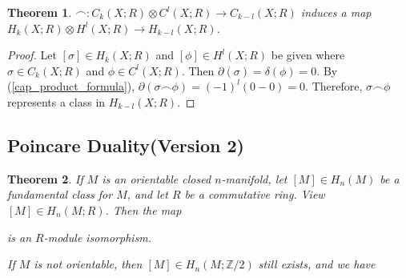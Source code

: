 \documentclass[psamsfonts]{amsart}
\newtheorem{thm}{Theorem}[section]
\theoremstyle{definition}
\theoremstyle{rem}
\numberwithin{equation}{section}
\begin{document}
\begin{thm}
  $\frown: C_k(X; R) \otimes C^l(X; R) \rightarrow C_{k - l}(X; R)$ induces a map $H_k(X; R) \otimes H^l(X; R) \rightarrow H_{k - l}(X; R)$.
\end{thm}

\begin{proof}
  Let $[\sigma] \in H_k(X; R)$ and $[\phi] \in H^l(X; R)$ be given where $\sigma \in C_k(X; R)$ and $\phi \in C^l(X; R)$.
  Then $\partial(\sigma) = \delta(\phi) = 0$.
  By (\ref{cap_product_formula}), $\partial(\sigma \frown \phi) = (-1)^l(0 - 0) = 0$.
  Therefore, $\sigma \frown \phi$ represents a class in $H_{k - l}(X; R)$.
\end{proof}

\subsection{Poincare Duality(Version 2)}

\begin{thm}\label{poincare_duality_2}
  If $M$ is an orientable closed $n$-manifold, let $[M] \in H_n(M)$ be a fundamental class for $M$, and let $R$ be a commutative ring.
  View $[M] \in H_n(M; R)$.
  Then the map
  \begin{center}
  \end{center}
  is an $R$-module isomorphism.

  If $M$ is not orientable, then $[M] \in H_n(M; \mathbb{Z} / 2)$ still exists, and we have
  \begin{center}
  \end{center}

\end{thm}
\end{document}

